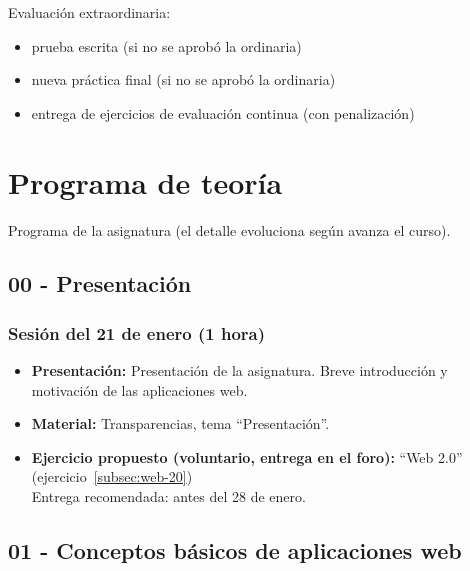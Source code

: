 \documentclass[a4paper,12pt]{article}
\begin{document}
Evaluación extraordinaria:

\begin{itemize}
\item prueba escrita (si no se aprobó la ordinaria)
\item nueva práctica final (si no se aprobó la ordinaria)
\item entrega de ejercicios de evaluación continua (con penalización)
\end{itemize}

\newpage

\section{Programa de teoría}

Programa de la asignatura (el detalle evoluciona según avanza el curso).

\subsection{00 - Presentación}

\subsubsection{Sesión del 21 de enero (1 hora)}

\begin{itemize}
\item \textbf{Presentación:} Presentación de la asignatura. Breve introducción y motivación de las aplicaciones web.
\item \textbf{Material:} Transparencias, tema ``Presentación''.
\item \textbf{Ejercicio propuesto (voluntario, entrega en el foro):} ``Web 2.0'' (ejercicio~\ref{subsec:web-20}) \\
  Entrega recomendada: antes del 28 de enero.
\end{itemize}


\subsection{01 - Conceptos básicos de aplicaciones web}
\end{document}
